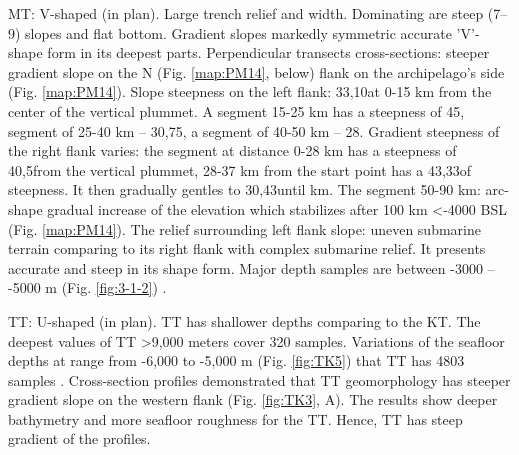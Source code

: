 \documentclass[11pt,a4paper]{report}
\begin{document}
{\ac{MT}: V-shaped (in plan). Large trench relief and width. Dominating are steep (7--9\degree) slopes and flat bottom. Gradient slopes markedly symmetric accurate 'V'-shape form in its deepest parts. Perpendicular transects cross-sections: steeper gradient slope on the N (Fig. \ref{map:PM14}, below) flank on the archipelago's side (Fig. \ref{map:PM14}). Slope steepness on the left flank: 33,10\degree\space at 0-15 km from the center of the vertical plummet. A segment 15-25 km has a steepness of 45\degree, segment of 25-40 km -- 30,75\degree, a segment of 40-50 km -- 28\degree. Gradient steepness of the right flank varies: the segment at distance 0-28 km has a steepness of 40,5\degree\space from the vertical plummet, 28-37 km from the start point has a 43,33\degree\space of steepness. It then gradually gentles to 30,43\degree\space until  km. The segment 50-90 km: arc-shape gradual increase of the elevation which stabilizes after 100 km <-4000 \ac{BSL} (Fig. \ref{map:PM14}). The relief surrounding left flank slope: uneven submarine terrain comparing to its right flank with complex submarine relief. It presents accurate and steep in its shape form. Major depth samples are between -3000 -- -5000 m (Fig. \ref{fig:3-1-2}) .

\ac{TT}: U-shaped (in plan). \ac{TT} has shallower depths comparing to the \ac{KT}. The deepest values of \ac{TT} >9,000 meters cover 320 samples. Variations of the seafloor depths at range from -6,000 to -5,000 m (Fig. \ref{fig:TK5}) that \ac{TT} has 4803 samples \cite{Lemenkova201994}. Cross-section profiles demonstrated that \ac{TT} geomorphology has steeper gradient slope on the western flank (Fig. \ref{fig:TK3}, A). The results show deeper bathymetry and more seafloor roughness for the \ac{TT}. Hence, \ac{TT} has steep gradient of the profiles. 

}
\end{document}
